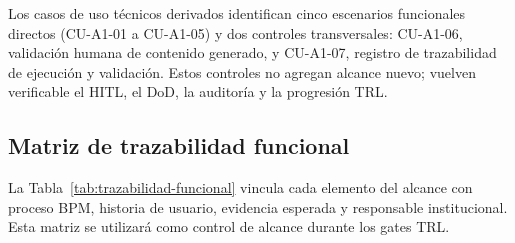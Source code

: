 \documentclass[a4paper, 12pt]{article}
\begin{document}
Los casos de uso t\'ecnicos derivados identifican cinco escenarios funcionales directos (CU-A1-01 a CU-A1-05) y dos controles transversales: CU-A1-06, validaci\'on humana de contenido generado, y CU-A1-07, registro de trazabilidad de ejecuci\'on y validaci\'on. Estos controles no agregan alcance nuevo; vuelven verificable el \ac{HITL}, el \ac{DoD}, la auditor\'ia y la progresi\'on \ac{TRL}.

\subsection{Matriz de trazabilidad funcional}

La Tabla~\ref{tab:trazabilidad-funcional} vincula cada elemento del alcance con proceso \ac{BPM}, historia de usuario, evidencia esperada y responsable institucional. Esta matriz se utilizar\'a como control de alcance durante los gates \ac{TRL}.
\end{document}
